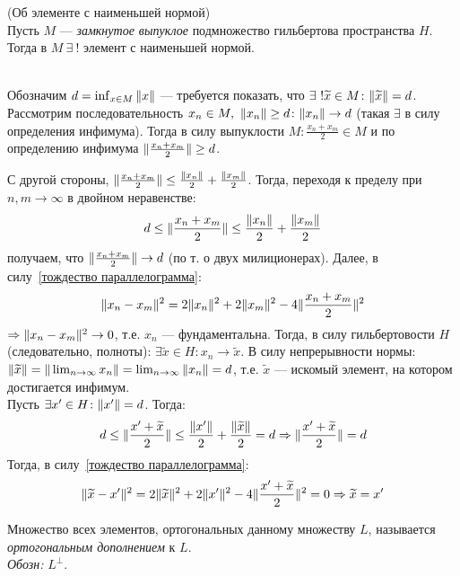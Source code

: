\begin{theorem}
\label{теорема об элементе с наименьшей нормой}
(Об элементе с наименьшей нормой)
~\\
Пусть $M$ --- \emph{замкнутое выпуклое} подмножество гильбертова пространства $H$. Тогда в $M~\exists~!$ элемент с наименьшей нормой. 
\end{theorem}
\begin{proofocre}
~\\
\boxed{\exists} Обозначим $d = \inf_{x\in M}\|x\|$ --- требуется показать, что $\exists~!\widetilde{x}\in M\colon\|\widetilde{x}\|=d$. Рассмотрим последовательность $x_n\in M,~\|x_n\|\ge d\colon\|x_n\| \to d$ (такая $\exists$ в силу определения инфимума). Тогда в силу выпуклости $M\colon\frac{x_n + x_m}{2}\in M$ и по определению инфимума $\|\frac{x_n + x_m}{2}\|\ge d$.

С другой стороны, $\|\frac{x_n + x_m}{2}\|\le\frac{\|x_n\|}{2} + \frac{\|x_m\|}{2}$. Тогда, переходя к пределу при $n,m\to\infty$ в двойном неравенстве:
$$d\le\|\frac{x_n + x_m}{2}\|\le\frac{\|x_n\|}{2} + \frac{\|x_m\|}{2}$$
получаем, что $\|\frac{x_n + x_m}{2}\|\to d$ (по т. о двух милиционерах). Далее, в силу~\eqref{тождество параллелограмма}:
$$ \|x_n - x_m\|^2 = 2\|x_n\|^2 + 2\|x_m\|^2 - 4\|\frac{x_n + x_m}{2}\|^2 $$
$\Rightarrow \|x_n - x_m\|^2 \to 0$, т.е. $x_n$ --- фундаментальна. Тогда, в силу гильбертовости $H$ (следовательно, полноты):
$\exists\widetilde{x}\in H\colon x_n\to \widetilde{x}$. В силу непрерывности нормы:
$\|\widetilde{x}\|=\|\lim_{n\to\infty}x_n\|=\lim_{n\to\infty}\|x_n\|=d$, т.е. $\widetilde{x}$ --- искомый элемент, на котором достигается инфимум.
~\\
\boxed{!} Пусть $\exists x'\in H\colon \|x'\| = d$. Тогда:
$$d\le\|\frac{x' + \widetilde{x}}{2}\|\le\frac{\|x'\|}{2} + \frac{\|\widetilde{x}\|}{2} = d \Rightarrow \|\frac{x' + \widetilde{x}}{2}\| = d$$
Тогда, в силу~\eqref{тождество параллелограмма}:
$$\|\widetilde{x} - x'\|^2 = 2\|\widetilde{x}\|^2 + 2\|x'\|^2-4\|\frac{x' + \widetilde{x}}{2}\|^2=0 \Rightarrow \widetilde{x} = x'$$
\end{proofocre}

\begin{definition}
Множество всех элементов, ортогональных данному множеству $L$, называется \emph{ортогональным дополнением} к $L$.\\
\emph{Обозн:} $L^{\perp}$.
\end{definition}

